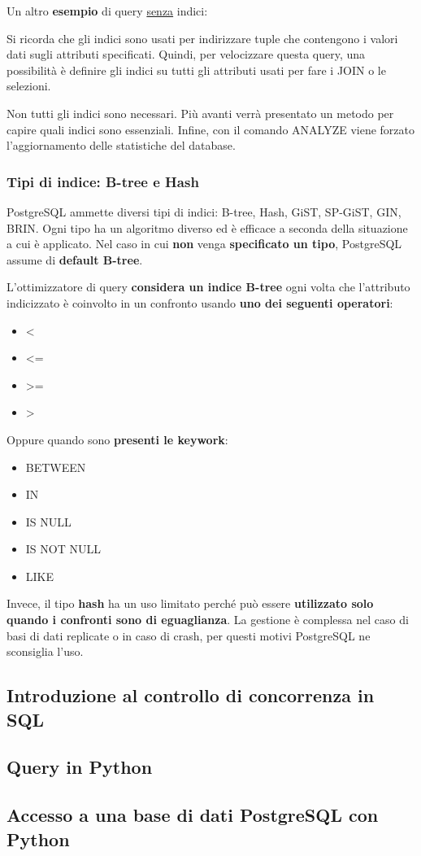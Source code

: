 \documentclass[a4paper]{article}
\begin{document}
	\noindent
	Un altro \textcolor{Green4}{\textbf{esempio}} di query \underline{senza} indici:
	
	Si ricorda che gli indici sono usati per indirizzare tuple che contengono i valori dati sugli attributi specificati. Quindi, per velocizzare questa query, una possibilità è definire gli indici su tutti gli attributi usati per fare i JOIN o le selezioni.
	
	Non tutti gli indici sono necessari. Più avanti verrà presentato un metodo per capire quali indici sono essenziali. Infine, con il comando ANALYZE viene forzato l'aggiornamento delle statistiche del database.\newpage
	
	\subsubsection{Tipi di indice: B-tree e Hash}
	
	PostgreSQL ammette diversi tipi di indici: B-tree, Hash, GiST, SP-GiST, GIN, BRIN. Ogni tipo ha un algoritmo diverso ed è efficace a seconda della situazione a cui è applicato. Nel caso in cui \textbf{non} venga \textbf{specificato un tipo}, PostgreSQL assume di \textbf{default B-tree}.\newline
	
	\noindent
	L'ottimizzatore di query \textbf{considera un indice \textcolor{Red3}{B-tree}} ogni volta che l'attributo indicizzato è coinvolto in un confronto usando \textbf{uno dei seguenti operatori}:
	\begin{itemize}
		\item <
		\item <=
		\item >=
		\item >
	\end{itemize}
	Oppure quando sono \textbf{presenti le keywork}:
	\begin{itemize}
		\item \textsf{BETWEEN}
		\item \textsf{IN}
		\item \textsf{IS NULL}
		\item \textsf{IS NOT NULL}
		\item \textsf{LIKE}
	\end{itemize}
	Invece, il tipo \textcolor{Red3}{\textbf{hash}} ha un uso limitato perché può essere \textbf{utilizzato solo quando i confronti sono di eguaglianza}. La gestione è complessa nel caso di basi di dati replicate o in caso di crash, per questi motivi PostgreSQL ne sconsiglia l'uso.
	
	\subsection{Introduzione al controllo di concorrenza in SQL}
	
	\subsection{Query in Python}
	
	\subsection{Accesso a una base di dati PostgreSQL con Python}
\end{document}
